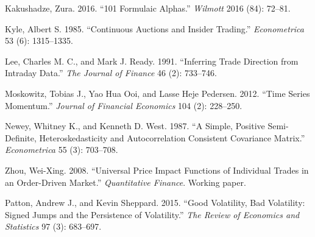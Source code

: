 \documentclass[12pt]{article}
\begin{document}
\noindent\hangindent=0.5in Kakushadze, Zura. 2016. ``101 Formulaic Alphas.''
\emph{Wilmott} 2016 (84): 72--81.

\noindent\hangindent=0.5in Kyle, Albert S. 1985. ``Continuous Auctions and Insider
Trading.'' \emph{Econometrica} 53 (6): 1315--1335.

\noindent\hangindent=0.5in Lee, Charles M. C., and Mark J. Ready. 1991.
``Inferring Trade Direction from Intraday Data.'' \emph{The Journal of Finance}
46 (2): 733--746.

\noindent\hangindent=0.5in Moskowitz, Tobias J., Yao Hua Ooi, and Lasse Heje
Pedersen. 2012. ``Time Series Momentum.'' \emph{Journal of Financial Economics}
104 (2): 228--250.

\noindent\hangindent=0.5in Newey, Whitney K., and Kenneth D. West. 1987. ``A
Simple, Positive Semi-Definite, Heteroskedasticity and Autocorrelation Consistent
Covariance Matrix.'' \emph{Econometrica} 55 (3): 703--708.

\noindent\hangindent=0.5in Zhou, Wei-Xing. 2008. ``Universal Price Impact
Functions of Individual Trades in an Order-Driven Market.'' \emph{Quantitative
Finance}. Working paper.

\noindent\hangindent=0.5in Patton, Andrew J., and Kevin Sheppard. 2015. ``Good
Volatility, Bad Volatility: Signed Jumps and the Persistence of Volatility.''
\emph{The Review of Economics and Statistics} 97 (3): 683--697.
\end{document}
